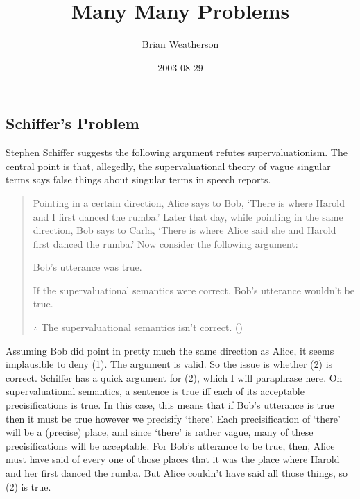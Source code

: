 \documentclass[
  11pt,
  letterpaper,
  DIV=11,
  numbers=noendperiod,
  oneside]{scrartcl}
\title{Many Many Problems}
\author{Brian Weatherson}
\date{2003-08-29}
\begin{document}
\maketitle
\subsection{Schiffer's Problem}\label{schiffers-problem}

Stephen Schiffer suggests the following argument refutes
supervaluationism. The central point is that, allegedly, the
supervaluational theory of vague singular terms says false things about
singular terms in speech reports.


\begin{quote}
Pointing in a certain direction, Alice says to Bob, `There is where
Harold and I first danced the rumba.' Later that day, while pointing in
the same direction, Bob says to Carla, `There is where Alice said she
and Harold first danced the rumba.' Now consider the following argument:

Bob's utterance was true.

If the supervaluational semantics were correct, Bob's utterance wouldn't
be true.

\(\therefore\) The supervaluational semantics isn't correct.
()
\end{quote}

Assuming Bob did point in pretty much the same direction as Alice, it
seems implausible to deny (1). The argument is valid. So the issue is
whether (2) is correct. Schiffer has a quick argument for (2), which I
will paraphrase here. On supervaluational semantics, a sentence is true
iff each of its acceptable precisifications is true. In this case, this
means that if Bob's utterance is true then it must be true however we
precisify `there'. Each precisification of `there' will be a (precise)
place, and since `there' is rather vague, many of these precisifications
will be acceptable. For Bob's utterance to be true, then, Alice must
have said of every one of those places that it was the place where
Harold and her first danced the rumba. But Alice couldn't have said all
those things, so (2) is true.
\end{document}

